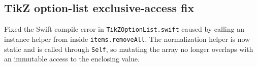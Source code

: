 \documentclass[a4paper]{article}
\begin{document}
   \begin{preview}
      \section*{TikZ option-list exclusive-access fix}
      Fixed the Swift compile error in \texttt{TikZOptionList.swift} caused by calling an instance helper from inside \texttt{items.removeAll}. The normalization helper is now static and is called through \texttt{Self}, so mutating the array no longer overlaps with an immutable access to the enclosing value.
   \end{preview}
\end{document}
